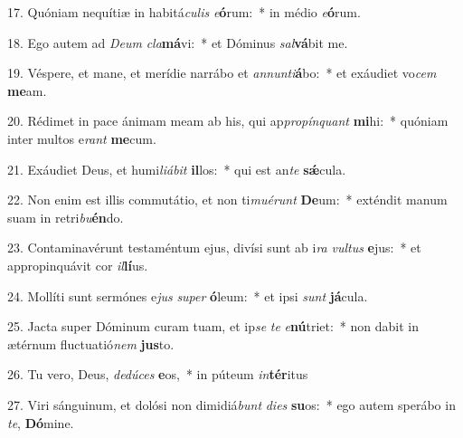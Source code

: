 17. Quóniam nequítiæ in habitá\textit{cu}\textit{lis} \textit{e}\textbf{ó}rum:~*  in médio \textit{e}\textbf{ó}rum.\

18. Ego autem ad \textit{De}\textit{um} \textit{cla}\textbf{má}vi:~*  et Dóminus \textit{sal}\textbf{vá}bit me.\

19. Véspere, et mane, et merídie narrábo et \textit{an}\textit{nun}\textit{ti}\textbf{á}bo:~*  et exáudiet vo\textit{cem} \textbf{me}am.\

20. Rédimet in pace ánimam meam ab his, qui ap\textit{pro}\textit{pín}\textit{quant} \textbf{mi}hi:~*  quóniam inter multos e\textit{rant} \textbf{me}cum.\

21. Exáudiet Deus, et humi\textit{li}\textit{á}\textit{bit} \textbf{il}los:~*  qui est an\textit{te} \textbf{sǽ}cula.\

22. Non enim est illis commutátio, et non ti\textit{mu}\textit{é}\textit{runt} \textbf{De}um:~*  exténdit manum suam in retri\textit{bu}\textbf{én}do.\

23. Contaminavérunt testaméntum ejus, divísi sunt ab i\textit{ra} \textit{vul}\textit{tus} \textbf{e}jus:~*  et appropinquávit cor \textit{il}\textbf{lí}us.\

24. Mollíti sunt sermónes e\textit{jus} \textit{su}\textit{per} \textbf{ó}leum:~*  et ipsi \textit{sunt} \textbf{já}cula.\

25. Jacta super Dóminum curam tuam, et ip\textit{se} \textit{te} \textit{e}\textbf{nú}triet:~*  non dabit in ætérnum fluctuatió\textit{nem} \textbf{jus}to.\

26. Tu vero, Deus, \textit{de}\textit{dú}\textit{ces} \textbf{e}os,~*  in púteum \textit{in}\textbf{tér}itus\

27. Viri sánguinum, et dolósi non dimidiá\textit{bunt} \textit{di}\textit{es} \textbf{su}os:~*  ego autem sperábo in \textit{te}, \textbf{Dó}mine.\

